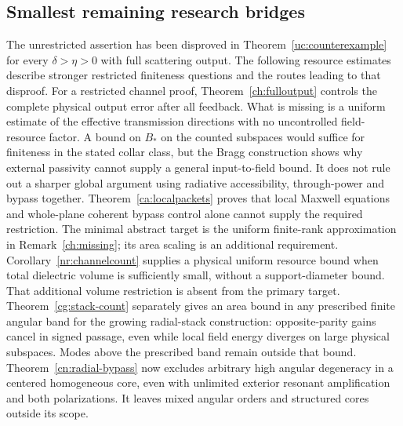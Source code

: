 \subsection{Smallest remaining research bridges}
\label{ver:gaps}
The unrestricted assertion has been disproved in
Theorem~\ref{uc:counterexample} for every $\delta>\eta>0$ with full
scattering output. The following resource estimates describe stronger
restricted finiteness questions and the routes leading to that disproof.
For a restricted channel proof, Theorem~\ref{ch:fulloutput} controls the
complete physical output error after all feedback. What is missing is
a uniform estimate of the effective transmission directions with no
uncontrolled field-resource factor. A bound on $B_*$ on the counted
subspaces would suffice for finiteness in the stated collar class, but
the Bragg construction shows why external passivity cannot supply a
general input-to-field bound. It does not rule out a sharper global
argument using radiative accessibility, through-power and bypass together.
Theorem~\ref{ca:localpackets} proves that local Maxwell equations and
whole-plane coherent bypass control alone cannot supply the required
restriction. The minimal abstract target is
the uniform finite-rank approximation in Remark~\ref{ch:missing};
its area scaling is an additional requirement.
Corollary~\ref{nr:channelcount} supplies a physical uniform resource
bound when total dielectric volume is sufficiently small, without a
support-diameter bound. That additional volume restriction is absent
from the primary target. Theorem~\ref{cg:stack-count} separately gives
an area bound in any prescribed finite angular band for the growing
radial-stack construction: opposite-parity gains cancel in signed
passage, even while local field energy diverges on large physical
subspaces. Modes above the prescribed band remain outside that bound.
Theorem~\ref{cn:radial-bypass} now excludes arbitrary high angular
degeneracy in a centered homogeneous core, even with unlimited exterior
resonant amplification and both polarizations. It leaves mixed angular
orders and structured cores outside its scope.

